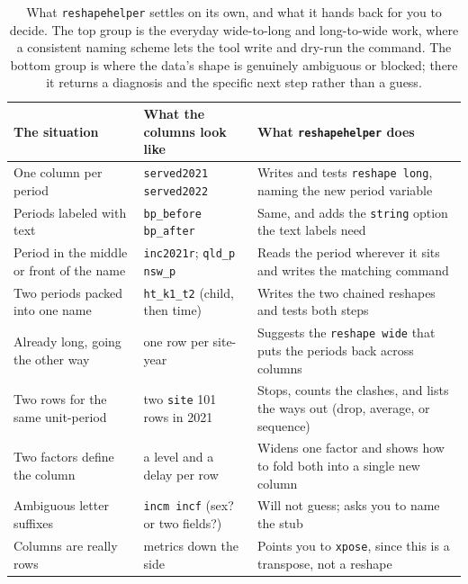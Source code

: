 \begin{table}[htbp]
\centering
\caption[What reshapehelper settles and what it hands back]{What \texttt{reshapehelper} settles on its own, and what it hands back for you to decide. The top group is the everyday wide-to-long and long-to-wide work, where a consistent naming scheme lets the tool write and dry-run the command. The bottom group is where the data's shape is genuinely ambiguous or blocked; there it returns a diagnosis and the specific next step rather than a guess.}
\label{tab:reshapehelper}
{\footnotesize
\begin{tabular}{@{}p{4.5cm}p{4.0cm}p{6.2cm}@{}}
\toprule
\textbf{The situation} & \textbf{What the columns look like} & \textbf{What \texttt{reshapehelper} does} \\
\midrule
One column per period & \texttt{served2021 served2022} & Writes and tests \texttt{reshape long}, naming the new period variable \\
\addlinespace
Periods labeled with text & \texttt{bp\_before bp\_after} & Same, and adds the \texttt{string} option the text labels need \\
\addlinespace
Period in the middle or front of the name & \texttt{inc2021r}; \texttt{qld\_p nsw\_p} & Reads the period wherever it sits and writes the matching command \\
\addlinespace
Two periods packed into one name & \texttt{ht\_k1\_t2} (child, then time) & Writes the two chained reshapes and tests both steps \\
\addlinespace
Already long, going the other way & one row per site-year & Suggests the \texttt{reshape wide} that puts the periods back across columns \\
\midrule
Two rows for the same unit-period & two \texttt{site} 101 rows in 2021 & Stops, counts the clashes, and lists the ways out (drop, average, or sequence) \\
\addlinespace
Two factors define the column & a level and a delay per row & Widens one factor and shows how to fold both into a single new column \\
\addlinespace
Ambiguous letter suffixes & \texttt{incm incf} (sex? or two fields?) & Will not guess; asks you to name the stub \\
\addlinespace
Columns are really rows & metrics down the side & Points you to \texttt{xpose}, since this is a transpose, not a reshape \\
\bottomrule
\end{tabular}
}
\end{table}

